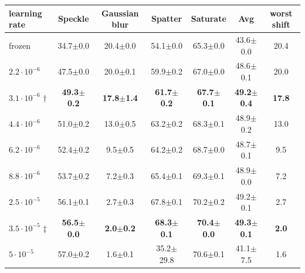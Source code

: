 \begin{tabular}{@{}l ccccc c@{}}
\toprule
learning rate & Speckle & Gaussian blur & Spatter & Saturate & Avg & worst shift \\
\midrule
frozen & 34.7$\pm$0.0 & 20.4$\pm$0.0 & 54.1$\pm$0.0 & 65.3$\pm$0.0 & 43.6$\pm$0.0 & 20.4 \\
\midrule
$2.2{\cdot}10^{-6}$ & 47.5$\pm$0.0 & 20.0$\pm$0.1 & 59.9$\pm$0.2 & 67.0$\pm$0.0 & 48.6$\pm$0.1 & 20.0 \\
$3.1{\cdot}10^{-6}$ $\dagger$ & \textbf{49.3$\pm$0.2} & \textbf{17.8$\pm$1.4} & \textbf{61.7$\pm$0.2} & \textbf{67.7$\pm$0.1} & \textbf{49.2$\pm$0.4} & \textbf{17.8} \\
$4.4{\cdot}10^{-6}$ & 51.0$\pm$0.2 & 13.0$\pm$0.5 & 63.2$\pm$0.2 & 68.3$\pm$0.1 & 48.9$\pm$0.2 & 13.0 \\
$6.2{\cdot}10^{-6}$ & 52.4$\pm$0.2 & 9.5$\pm$0.5 & 64.2$\pm$0.2 & 68.7$\pm$0.0 & 48.7$\pm$0.1 & 9.5 \\
$8.8{\cdot}10^{-6}$ & 53.7$\pm$0.2 & 7.2$\pm$0.3 & 65.4$\pm$0.1 & 69.3$\pm$0.1 & 48.9$\pm$0.0 & 7.2 \\
$2.5{\cdot}10^{-5}$ & 56.1$\pm$0.1 & 2.7$\pm$0.3 & 67.8$\pm$0.1 & 70.2$\pm$0.2 & 49.2$\pm$0.1 & 2.7 \\
$3.5{\cdot}10^{-5}$ $\ddagger$ & \textbf{56.5$\pm$0.0} & \textbf{2.0$\pm$0.2} & \textbf{68.3$\pm$0.1} & \textbf{70.4$\pm$0.0} & \textbf{49.3$\pm$0.1} & \textbf{2.0} \\
$5{\cdot}10^{-5}$ & 57.0$\pm$0.2 & 1.6$\pm$0.1 & 35.2$\pm$29.8 & 70.6$\pm$0.1 & 41.1$\pm$7.5 & 1.6 \\
\bottomrule
\end{tabular}
